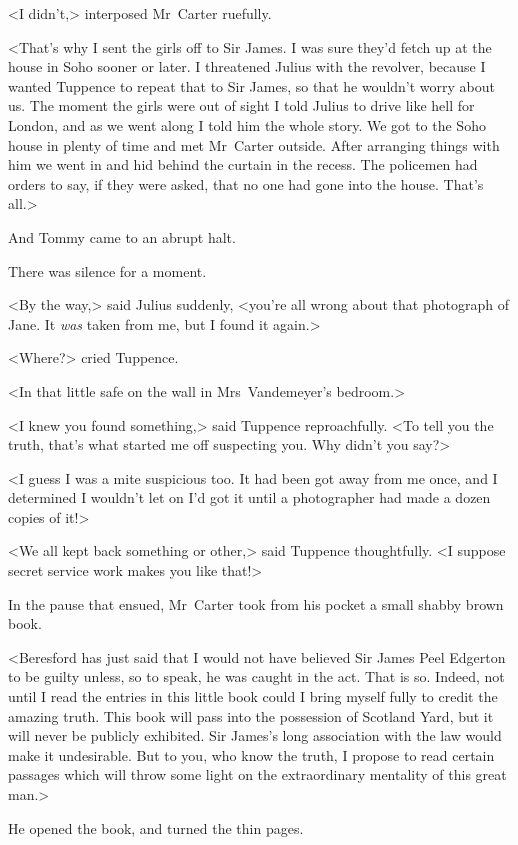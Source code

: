 <I didn't,> interposed Mr~Carter ruefully.

<That's why I sent the girls off to Sir James. I was sure they'd fetch up at the house in Soho sooner or later. I threatened Julius with the revolver, because I wanted Tuppence to repeat that to Sir James, so that he wouldn't worry about us. The moment the girls were out of sight I told Julius to drive like hell for London, and as we went along I told him the whole story. We got to the Soho house in plenty of time and met Mr~Carter outside. After arranging things with him we went in and hid behind the curtain in the recess. The policemen had orders to say, if they were asked, that no one had gone into the house. That's all.>

And Tommy came to an abrupt halt.

There was silence for a moment.

<By the way,> said Julius suddenly, <you're all wrong about that photograph of Jane. It \emph{was} taken from me, but I found it again.>

<Where?> cried Tuppence.

<In that little safe on the wall in Mrs~Vandemeyer's bedroom.>

<I knew you found something,> said Tuppence reproachfully. <To tell you the truth, that's what started me off suspecting you. Why didn't you say?>

<I guess I was a mite suspicious too. It had been got away from me once, and I determined I wouldn't let on I'd got it until a photographer had made a dozen copies of it!>

<We all kept back something or other,> said Tuppence thoughtfully. <I suppose secret service work makes you like that!>

In the pause that ensued, Mr~Carter took from his pocket a small shabby brown book.

<Beresford has just said that I would not have believed Sir James Peel Edgerton to be guilty unless, so to speak, he was caught in the act. That is so. Indeed, not until I read the entries in this little book could I bring myself fully to credit the amazing truth. This book will pass into the possession of Scotland Yard, but it will never be publicly exhibited. Sir James's long association with the law would make it undesirable. But to you, who know the truth, I propose to read certain passages which will throw some light on the extraordinary mentality of this great man.>

He opened the book, and turned the thin pages.

